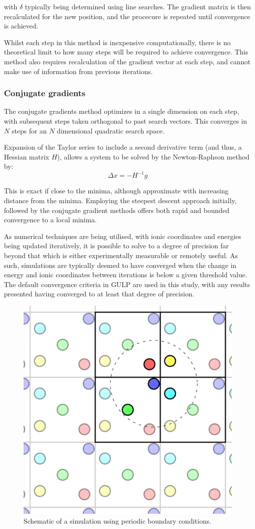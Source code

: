 with $\delta$ typically being determined using line searches.
The gradient matrix is then recalculated for the new position, and the procecure is repeated until convergence is achieved.

Whilst each step in this method is inexpensive computationally, there is no theoretical limit to how many steps will be required to achieve convergence.
This method also requires recalculation of the gradient vector at each step, and cannot make use of information from previous iterations.

\subsubsection{Conjugate gradients}
The conjugate gradients method optimizes in a single dimension on each step, with subsequent steps taken orthogonal to past search vectors.
This converges in $N$ steps for an $N$ dimensional quadratic search space.

Expansion of the Taylor series to include a second derivative term (and thus, a Hessian matrix $H$), allows a system to be solved by the Newton-Raphson method by:
$$
\Delta x = -H^{-1}g
$$

This is exact if close to the minima, although approximate with increasing distance from the minima.
Employing the steepest descent approach initially, followed by the conjugate gradient methods offers both rapid and bounded convergence to a local minima.


As numerical techniques are being utilised, with ionic coordinates and energies being updated iteratively, it is possible to solve to a degree of precision far beyond that which is either experimentally measurable or remotely useful.
As such, simulations are typically deemed to have converged when the change in energy and ionic coordinates between iterations is below a given threshold value.
The default convergence criteria in GULP are used in this study, with any results presented having converged to at least that degree of precision.

\newpage
\begin{figure}[h]
  \centering
  \includegraphics[width = 0.55\linewidth]{figures/pbc/pbc}
  \caption[Periodic boundary conditions schematic]{Schematic of a simulation using periodic boundary conditions.}
  \label{fig:periodic}
\end{figure}

